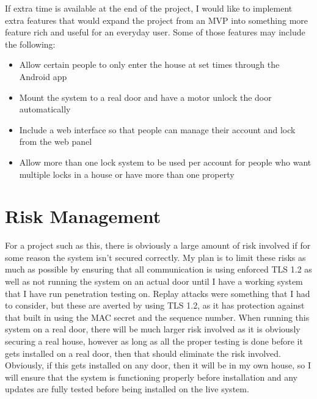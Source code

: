 If extra time is available at the end of the project, I would like to implement extra features that would expand the project from an MVP into something more feature rich and useful for an everyday user. Some of those features may include the following:

\begin{itemize}
	\item Allow certain people to only enter the house at set times through the Android app
	\item Mount the system to a real door and have a motor unlock the door automatically
	\item Include a web interface so that people can manage their account and lock from the web panel
	\item Allow more than one lock system to be used per account for people who want multiple locks in a house or have more than one property
\end{itemize}


\section{Risk Management}
For a project such as this, there is obviously a large amount of risk involved if for some reason the system isn't secured correctly. My plan is to limit these risks as much as possible by ensuring that all communication is using enforced TLS 1.2 as well as not running the system on an actual door until I have a working system that I have run penetration testing on. Replay attacks were something that I had to consider, but these are averted by using TLS 1.2, as it has protection against that built in using the MAC secret and the sequence number. When running this system on a real door, there will be much larger risk involved as it is obviously securing a real house, however as long as all the proper testing is done before it gets installed on a real door, then that should eliminate the risk involved. Obviously, if this gets installed on any door, then it will be in my own house, so I will ensure that the system is functioning properly before installation and any updates are fully tested before being installed on the live system.


